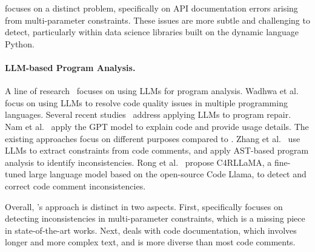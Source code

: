 \toolchecker focuses on a distinct problem, specifically on API documentation errors arising from multi-parameter constraints. These issues are more subtle and challenging to detect, particularly within data science libraries built on the dynamic language Python.


\paragraph{LLM-based Program Analysis.}
A line of research~\cite{wadhwa2024codequality,jin2023programrepair,yang2024programrepair,xia2024programrepair,nam2024codeunderstand,zhang2024codeinconsistency} focuses on using LLMs for program analysis. Wadhwa et al.~\cite{wadhwa2024codequality} focus on using LLMs to resolve code quality issues in multiple programming languages. Several recent studies~\cite{jin2023programrepair, yang2024programrepair, xia2024programrepair} address applying LLMs to program repair. Nam et al.~\cite{nam2024codeunderstand} apply the GPT model to explain code and provide usage details.
The existing approaches focus on different purposes compared to \toolchecker.
Zhang et al.~\cite{zhang2024codeinconsistency,zhang2024codeinconsistencyase} use LLMs to extract constraints from code comments, and apply AST-based program analysis to identify inconsistencies.
Rong et al.~\cite{rong2024code} propose C4RLLaMA, a fine-tuned large language model based on the open-source Code Llama, to detect and correct code comment inconsistencies.


Overall, \toolchecker's approach is distinct in two aspects.
First, \toolchecker specifically focuses on detecting inconsistencies in multi-parameter constraints, which is a missing piece in state-of-the-art works.
Next, \toolchecker deals with code documentation, which involves longer and more complex text, and is more diverse than most code comments.


